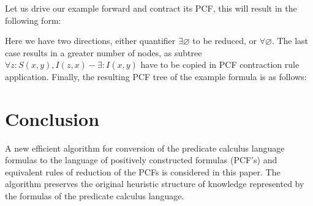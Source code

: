 \documentclass[a4paper,12pt]{article}
\begin{document}
Let us drive our example forward and contract its PCF, this will result in the following form:
\begin{center}
\end{center}

Here we have two directions, either quantifier $\exists\varnothing$ to be reduced, or  $\forall\varnothing$.  The last case results in a greater number of nodes, as subtree $\forall z\colon S(x,y),I(z,x) - \exists\colon I(x,y)$ have to be copied in PCF contraction rule application.  Finally, the resulting PCF tree of the example formula is as follows:

\begin{center}
\end{center}

\section{Conclusion}
A new efficient algorithm for conversion of the predicate calculus language formulas to the language of positively constructed formulas (PCF's) and equivalent rules of reduction of the  PCFs is considered in this paper.  The algorithm preserves the original heuristic structure of knowledge represented by the formulas of the predicate calculus language.
\end{document}
